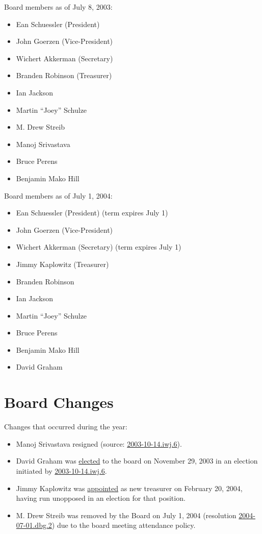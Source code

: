 \documentclass[letterpaper]{report}
\begin{document}
Board members as of July 8, 2003:

\begin{itemize}
\item Ean Schuessler (President)
\item John Goerzen (Vice-President)
\item Wichert Akkerman (Secretary)
\item Branden Robinson (Treasurer)
\item Ian Jackson
\item Martin ``Joey'' Schulze
\item M. Drew Streib
\item Manoj Srivastava
\item Bruce Perens
\item Benjamin Mako Hill
\end{itemize}

Board members as of July 1, 2004:

\begin{itemize}
\item Ean Schuessler (President) (term expires July 1)
\item John Goerzen (Vice-President)
\item Wichert Akkerman (Secretary) (term expires July 1)
\item Jimmy Kaplowitz (Treasurer)
\item Branden Robinson
\item Ian Jackson
\item Martin ``Joey'' Schulze
\item Bruce Perens
\item Benjamin Mako Hill
\item David Graham
\end{itemize}

\section{Board Changes}

Changes that occurred during the year:

\begin{itemize}
\item Manoj Srivastava resigned (source: \href{http://www.spi-inc.org/corporate/resolutions/2003/2003-10-14.iwj.6}{2003-10-14.iwj.6}).
\item David Graham was \href{http://lists.spi-inc.org/pipermail/spi-announce/2003/000065.html}{elected}
to the board on November 29, 2003 in an election initiated by \href{http://www.spi-inc.org/corporate/resolutions/2003/2003-10-14.iwj.6}{2003-10-14.iwj.6}.
\item Jimmy Kaplowitz was \href{http://lists.spi-inc.org/pipermail/spi-announce/2004/000070.html}{appointed}
as new treasurer on February 20, 2004, having run unopposed in an
election for that position.
\item M. Drew Streib was removed by the Board on July 1, 2004 (resolution
\href{http://lists.spi-inc.org/pipermail/spi-announce/2004/000083.html}{2004-07-01.dbg.2})
due to the board meeting attendance policy.
\end{itemize}
\end{document}
